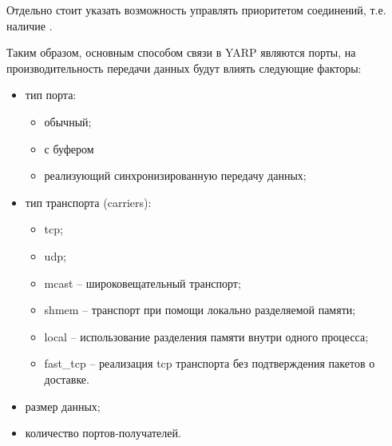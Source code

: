 Отдельно стоит указать возможность управлять приоритетом соединений, т.е. наличие .

Таким образом, основным способом связи в YARP являются порты, на производительность передачи данных будут влиять следующие факторы:
\begin{itemize}[noitemsep]
	\item тип порта:
	\begin{itemize}[noitemsep]
		\item обычный;
		\item с буфером
		\item реализующий синхронизированную передачу данных;
	\end{itemize}
	\item тип транспорта (carriers):
	\begin{itemize}[noitemsep]
		\item tcp;
		\item udp;
		\item mcast -- широковещательный транспорт;
		\item shmem -- транспорт при помощи локально разделяемой памяти;
		\item local -- использование разделения памяти внутри одного процесса;
		\item fast\_tcp -- реализация tcp транспорта без подтверждения пакетов о доставке.
	\end{itemize}
	\item размер данных;
	\item количество портов-получателей.
\end{itemize}